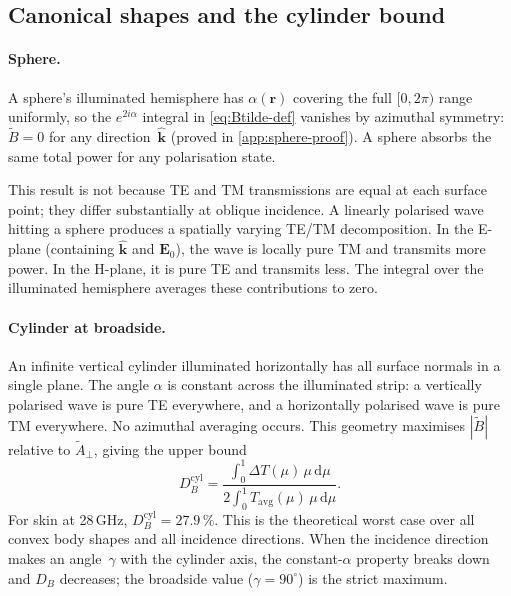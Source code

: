 \documentclass[11pt,a4paper]{article}
\theoremstyle{definition}      %
\newcommand{\khat}{\hat{\bm{k}}}
\newcommand{\rr}{\mathbf{r}}
\newcommand{\EE}{\mathbf{E}}
\newcommand{\Tavg}{T_{\mathrm{avg}}}
\newcommand{\diff}{\mathrm{d}}        %
\begin{document}
\subsection{Canonical shapes and the cylinder bound}
\label{sec:canonical-pol}

\paragraph{Sphere.}
A sphere's illuminated hemisphere has $\alpha(\rr)$ covering the full
$[0,2\pi)$ range uniformly, so the $e^{2i\alpha}$ integral in
\cref{eq:Btilde-def} vanishes by azimuthal symmetry:
$\tilde{B}=0$ for any direction~$\khat$ (proved in
\cref{app:sphere-proof}).  A sphere absorbs the same total power for
any polarisation state.

This result is not because TE and TM transmissions are equal
at each surface point; they differ substantially at oblique incidence.
A linearly polarised wave hitting a sphere produces a spatially
varying TE/TM decomposition.  In the E-plane (containing $\khat$ and
$\EE_0$), the wave is locally pure TM and transmits more power.  In
the H-plane, it is pure TE and transmits less.  The integral over
the illuminated hemisphere averages these contributions to zero.

\paragraph{Cylinder at broadside.}
An infinite vertical cylinder illuminated horizontally has all
surface normals in a single plane.  The angle $\alpha$ is constant
across the illuminated strip: a vertically polarised wave is pure TE
everywhere, and a horizontally polarised wave is pure TM everywhere.
No azimuthal averaging occurs.  This geometry maximises $|\tilde{B}|$
relative to $\tilde{A}_\perp$, giving the upper bound
\begin{equation}\label{eq:DB-cyl}
  D_B^{\mathrm{cyl}}
  = \frac{\displaystyle\int_0^1\Delta T(\mu)\,\mu\,\diff \mu}
         {\displaystyle 2\int_0^1\Tavg(\mu)\,\mu\,\diff \mu}.
\end{equation}
For skin at 28\,GHz, $D_B^{\mathrm{cyl}} = 27.9\,\%$.  This is the
theoretical worst case over all convex body shapes and all incidence
directions.  When the incidence direction makes an angle~$\gamma$
with the cylinder axis, the constant-$\alpha$ property breaks down
and $D_B$ decreases; the broadside value ($\gamma=90^\circ$) is the
strict maximum.
\end{document}
